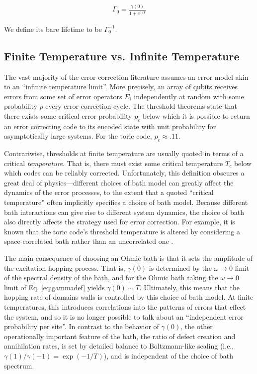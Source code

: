 \documentclass[twocolumn,superscriptaddress,aps,prb,floatfix]{revtex4-1}
\newcommand{\CMH}[1]{{\color{green} { #1}}}
\begin{document}
\begin{align}
\Gamma_0 = \frac{\gamma(0)}{1+e^{1/T}} 
\end{align}

We define its bare lifetime to be $\Gamma_0^{-1}$.

\subsection{Finite Temperature vs. Infinite Temperature}
\label{sec:temperature}

 The \CMH{\sout{vast}} majority of the error correction literature assumes an error model akin to an ``infinite temperature limit''.  More precisely, an array of qubits receives errors from some set of error operators ${E_i}$ independently at random with some probability $p$ every error correction cycle.  The threshold theorems state that there exists some critical error probability $p_c$ below which it is possible to return an error correcting code to its encoded state with unit probability for asymptotically large systems.  For the toric code, $p_c\approx.11$.
 
 Contrariwise, thresholds at finite temperature are usually quoted in terms of a critical \emph{temperature}.  That is, there must exist some critical temperature $T_c$ below which codes can be reliably corrected.  Unfortunately, this definition obscures a great deal of physics---different choices of bath model can greatly affect the dynamics of the error processes, to the extent that a quoted ``critical temperature'' often implicitly specifies a choice of bath model.  Because different bath interactions can give rise to different system dynamics, the choice of bath also directly affects the strategy used for error correction.  For example, it is known that the toric code's threshold temperature is altered by considering a space-correlated bath rather than an uncorrelated one \cite{Novais2013}.
 
 The main consequence of choosing an Ohmic bath is that it sets the amplitude of the excitation hopping process.  That is, $\gamma(0)$ is determined by the $\omega \rightarrow 0$ limit of the spectral density of the bath, and for the Ohmic bath taking the $\omega\rightarrow0$ limit of  Eq. \ref{eq:gammadef} yields $\gamma(0) \sim T$. 
Ultimately, this means that the hopping rate of domains walls is controlled by this choice of bath model. At finite temperatures, this introduces correlations into the patterns of errors that effect the system, and so it is no longer possible to talk about an ``independent error probability per site''. 
In contrast to the behavior of $\gamma(0)$, 
the other operationally important feature of the bath, the ratio of defect creation and annihilation rates, is set by detailed balance to Boltzmann-like scaling (i.e., $\gamma(1)/\gamma(-1) = \exp(-1/T)$), and is independent of the choice of bath spectrum.
 
\end{document}
